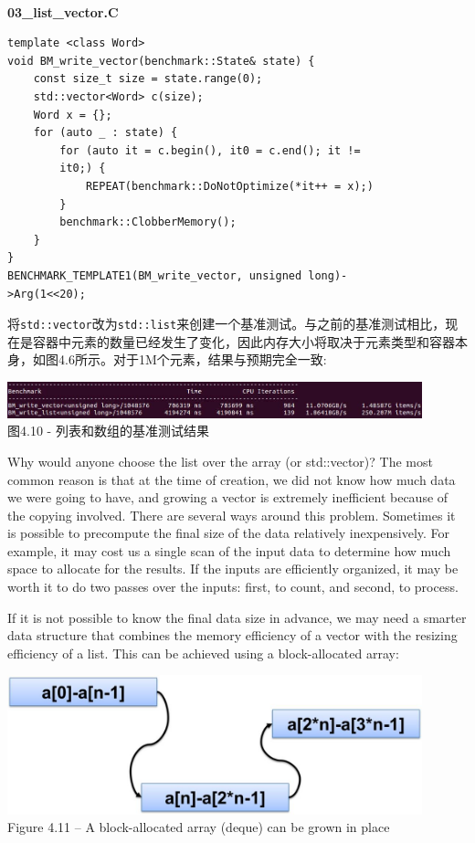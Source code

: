 \hspace*{\fill} \\ %
\noindent
\textbf{03\_list\_vector.C}
\begin{lstlisting}[style=styleCXX]
template <class Word>
void BM_write_vector(benchmark::State& state) {
	const size_t size = state.range(0);
	std::vector<Word> c(size);
	Word x = {};
	for (auto _ : state) {
		for (auto it = c.begin(), it0 = c.end(); it !=
		it0;) {
			REPEAT(benchmark::DoNotOptimize(*it++ = x);)
		}
		benchmark::ClobberMemory();
	}
}
BENCHMARK_TEMPLATE1(BM_write_vector, unsigned long)-
>Arg(1<<20);
\end{lstlisting}

将\texttt{std::vector}改为\texttt{std::list}来创建一个基准测试。与之前的基准测试相比，现在是容器中元素的数量已经发生了变化，因此内存大小将取决于元素类型和容器本身，如图4.6所示。对于1M个元素，结果与预期完全一致:

\begin{center}
\includegraphics[width=0.9\textwidth]{content/1/chapter4/images/10.jpg}\\
图4.10 - 列表和数组的基准测试结果
\end{center}

Why would anyone choose the list over the array (or std::vector)? The most common reason is that at the time of creation, we did not know how much data we were going to have, and growing a vector is extremely inefficient because of the copying involved. There are several ways around this problem. Sometimes it is possible to precompute the final size of the data relatively inexpensively. For example, it may cost us a single scan of the input data to determine how much space to allocate for the results. If the inputs are efficiently organized, it may be worth it to do two passes over the inputs: first, to count, and second, to process.

If it is not possible to know the final data size in advance, we may need a smarter data structure that combines the memory efficiency of a vector with the resizing efficiency of a list. This can be achieved using a block-allocated array:

\begin{center}
\includegraphics[width=0.9\textwidth]{content/1/chapter4/images/11.jpg}\\
Figure 4.11 – A block-allocated array (deque) can be grown in place
\end{center}


